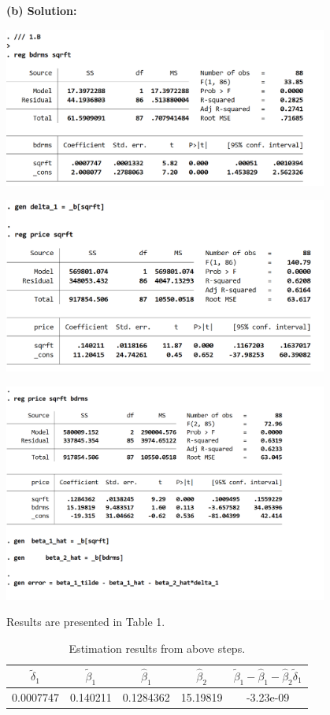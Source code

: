 \documentclass[12pt, oneside]{article}
\begin{document}
\textbf{(b) Solution:}
\begin{center}
    
    \includegraphics[width=0.8\textwidth]{Figure/P1.D.jpg}

    \includegraphics[width=0.8\textwidth]{Figure/P1.E.jpg}

    \includegraphics[width=0.8\textwidth]{Figure/P1.F.jpg}

\end{center}

Results are presented in Table 1.

\begin{table}[h]
    \centering
    \caption{Estimation results from above steps.}
    \begin{tabular}{ccccc}
        \toprule
        $\tilde{\delta}_1$ & $\tilde{\beta}_1$ & $\hat{\beta}_1$ & $\hat{\beta}_2$ & $\tilde{\beta}_1 - \hat{\beta}_1 - \hat{\beta}_2 \tilde{\delta}_1$ \\
        \midrule
        0.0007747 & 0.140211 & 0.1284362 & 15.19819 & -3.23e-09 \\
        \bottomrule
    \end{tabular}
\end{table}
\end{document}
